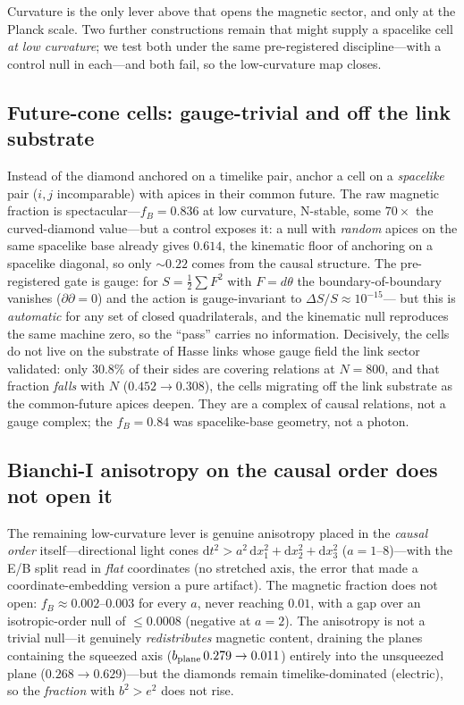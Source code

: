 \documentclass[aps,prd,reprint,nofootinbib,superscriptaddress,floatfix]{revtex4-2}
\newcommand{\fracB}{f_{\!B}}
\begin{document}
Curvature is the only lever above that opens the magnetic sector, and only at the Planck
scale. Two further constructions remain that might supply a spacelike cell \emph{at low
curvature}; we test both under the same pre-registered discipline---with a control null in
each---and both fail, so the low-curvature map closes.

\subsection{Future-cone cells: gauge-trivial and off the link substrate}\label{sec:futurecone}
Instead of the diamond anchored on a timelike pair, anchor a cell on a \emph{spacelike}
pair ($i,j$ incomparable) with apices in their common future. The raw magnetic fraction is
spectacular---$\fracB=0.836$ at low curvature, N-stable, some $70\times$ the curved-diamond
value---but a control exposes it: a null with \emph{random} apices on the same spacelike
base already gives $0.614$, the kinematic floor of anchoring on a spacelike diagonal, so
only $\sim0.22$ comes from the causal structure. The pre-registered gate is gauge: for
$S=\tfrac12\sum F^2$ with $F=d\theta$ the boundary-of-boundary vanishes
($\partial\partial=0$) and the action is gauge-invariant to $\Delta S/S\approx10^{-15}$---
but this is \emph{automatic} for any set of closed quadrilaterals, and the kinematic null
reproduces the same machine zero, so the ``pass'' carries no information. Decisively, the
cells do not live on the substrate of Hasse links whose gauge field the link sector
validated: only $30.8\%$ of their sides are covering relations at $N=800$, and that fraction
\emph{falls} with $N$ ($0.452\to0.308$), the cells migrating off the link substrate as the
common-future apices deepen. They are a complex of causal relations, not a gauge complex;
the $\fracB=0.84$ was spacelike-base geometry, not a photon.

\subsection{Bianchi-I anisotropy on the causal order does not open it}\label{sec:bianchi}
The remaining low-curvature lever is genuine anisotropy placed in the \emph{causal order}
itself---directional light cones $\mathrm{d}t^2>a^2\,\mathrm{d}x_1^2+\mathrm{d}x_2^2+
\mathrm{d}x_3^2$ ($a=1$--$8$)---with the E/B split read in \emph{flat} coordinates (no
stretched axis, the error that made a coordinate-embedding version a pure artifact). The
magnetic fraction does not open: $\fracB\approx0.002$--$0.003$ for every $a$, never reaching
$0.01$, with a gap over an isotropic-order null of $\le0.0008$ (negative at $a=2$). The
anisotropy is not a trivial null---it genuinely \emph{redistributes} magnetic content,
draining the planes containing the squeezed axis ($b_{\rm plane}\,0.279\to0.011$) entirely
into the unsqueezed plane ($0.268\to0.629$)---but the diamonds remain timelike-dominated
(electric), so the \emph{fraction} with $b^2>e^2$ does not rise.
\end{document}
